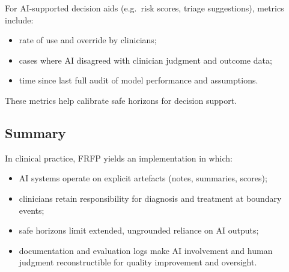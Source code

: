 For AI-supported decision aids (e.g.\ risk scores, triage suggestions),
metrics include:

\begin{itemize}
  \item rate of use and override by clinicians;
  \item cases where AI disagreed with clinician judgment and outcome data;
  \item time since last full audit of model performance and assumptions.
\end{itemize}

These metrics help calibrate safe horizons for decision support.

\subsection{Summary}

In clinical practice, FRFP yields an implementation in which:

\begin{itemize}
  \item AI systems operate on explicit artefacts (notes, summaries, scores);
  \item clinicians retain responsibility for diagnosis and treatment at
        boundary events;
  \item safe horizons limit extended, ungrounded reliance on AI outputs;
  \item documentation and evaluation logs make AI involvement and human
        judgment reconstructible for quality improvement and oversight.
\end{itemize}
